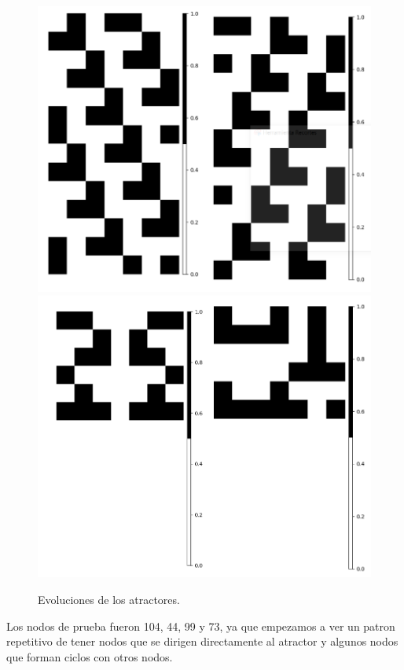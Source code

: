 \documentclass[11pt]{article}
\begin{document}
			\begin{figure}[H]
			\centering
			\includegraphics[scale=0.3]{resources/Atractores22/atractor_22_size_7_res.png}
			\includegraphics[scale=0.3]{resources/Atractores22/atractor_22_size_7_res1.png}
			\caption{Evoluciones de los atractores.}\label{fig:picture}
			\end{figure}
			Los nodos de prueba fueron 104, 44, 99 y 73, ya que empezamos a ver un patron repetitivo de tener nodos que se dirigen directamente al atractor y algunos nodos que forman ciclos con otros nodos.
\end{document}
